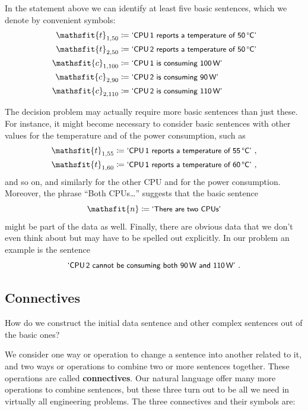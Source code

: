 \documentclass[
  a4paper,
  DIV=11,
  numbers=noendperiod,
  oneside]{scrreprt}
\begin{document}
In the statement above we can identify at least five basic sentences,
which we denote by convenient symbols: \begin{align*}
\mathsfit{t}_{1,50} &\coloneqq \textsf{\small`CPU\,1 reports a temperature of 50\,°C'}
\\
\mathsfit{t}_{2,50} &\coloneqq \textsf{\small`CPU\,2 reports a temperature of 50\,°C'}
\\
\mathsfit{c}_{1,100} &\coloneqq \textsf{\small`CPU\,1 is consuming 100\,W'}
\\
\mathsfit{c}_{2,90} &\coloneqq \textsf{\small`CPU\,2 is consuming 90\,W'}
\\
\mathsfit{c}_{2,110} &\coloneqq \textsf{\small`CPU\,2 is consuming 110\,W'}
\end{align*}

The decision problem may actually require more basic sentences than just
these. For instance, it might become necessary to consider basic
sentences with other values for the temperature and of the power
consumption, such as \[\begin{aligned}
\mathsfit{t}_{1,55} &\coloneqq \textsf{\small`CPU\,1 reports a temperature of 55\,°C'} \ ,
\\
\mathsfit{t}_{1,60} &\coloneqq \textsf{\small`CPU\,1 reports a temperature of 60\,°C'} \ ,
\end{aligned}\] and so on, and similarly for the other CPU and for the
power consumption. Moreover, the phrase ``Both CPUs\ldots{}'' suggests
that the basic sentence \[
\mathsfit{n} \coloneqq \textsf{\small`There are two CPUs'}
\] might be part of the data as well. Finally, there are obvious data
that we don't even think about but may have to be spelled out
explicitly. In our problem an example is the sentence \[
\textsf{\small`CPU\,2 cannot be consuming both 90\,W and 110\,W'} \ .
\]

\hypertarget{connectives}{%
\subsection{Connectives}\label{connectives}}

How do we construct the initial data sentence and other complex
sentences out of the basic ones?

We consider one way or operation to change a sentence into another
related to it, and two ways or operations to combine two or more
sentences together. These operations are called {\textbf{connectives}}.
Our natural language offer many more operations to combine sentences,
but these three turn out to be all we need in virtually all engineering
problems. The three connectives and their symbols are:
\end{document}
